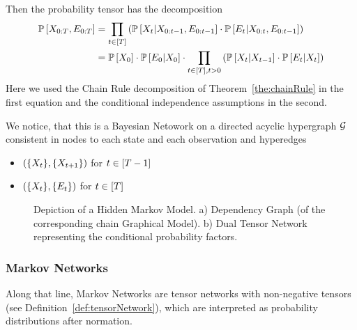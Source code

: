 Then the probability tensor has the decomposition 
\begin{align}
	\mathbb{P}\left[X_{0:T},E_{0:T}\right] 
	& = \prod_{t\in[T]}
	 \left( \mathbb{P}\left[X_{t}|X_{0:t-1},E_{0:t-1}\right] \cdot \mathbb{P}\left[E_{t}|X_{0:t},E_{0:t-1}\right] \right) \\
	& = \mathbb{P}\left[X_{0}\right] \cdot \mathbb{P}\left[E_{0}|X_{0}\right] \cdot \prod_{t\in[T], t>0} 
	\left( \mathbb{P}\left[X_{t}|X_{t-1}\right] \cdot \mathbb{P}\left[E_{t}|X_{t}\right] \right)
\end{align}
Here we used the Chain Rule decomposition of Theorem~\ref{the:chainRule} in the first equation and the conditional independence assumptions in the second.

We notice, that this is a Bayesian Netowork on a directed acyclic hypergraph $\mathcal{G}$ consistent in nodes to each state and each observation and hyperedges
\begin{itemize}
	\item $(\{X_{t}\}, \{X_{t+1}\})$ for $t\in[T-1]$
	\item $(\{X_{t}\}, \{E_{t}\})$ for $t\in[T]$
\end{itemize}


\begin{figure}[h]
\begin{center}
	
\end{center}
\caption{Depiction of a Hidden Markov Model. 
	a) Dependency Graph (of the corresponding chain Graphical Model).
	b) Dual Tensor Network representing the conditional probability factors.}
\label{fig:HMM}
\end{figure}



\subsubsection{Markov Networks}

Along that line, Markov Networks are tensor networks with non-negative tensors (see Definition~\ref{def:tensorNetwork}), which are interpreted as probability distributions after normation.

